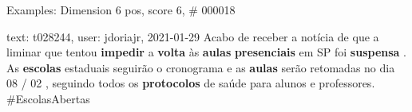 \begin{frame}{Examples: Dimension 6 pos, score 6, \# 000018}
\footnotesize
\begin{exampleblock}{text: t028244, user: jdoriajr, 2021-01-29}
Acabo de receber a notícia de que a liminar que tentou \textbf{impedir} a 
\textbf{volta} às \textbf{aulas} \textbf{presenciais} em SP foi 
\textbf{suspensa} . As \textbf{escolas} estaduais seguirão o cronograma e as 
\textbf{aulas} serão retomadas no dia 08 / 02 , seguindo todos os 
\textbf{protocolos} de saúde para alunos e professores. \#EscolasAbertas 
\end{exampleblock}
\end{frame}
